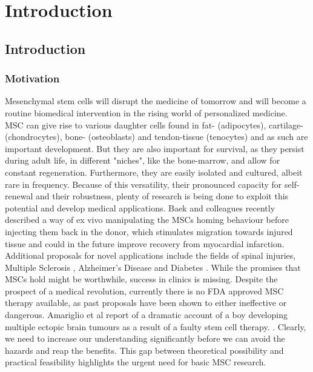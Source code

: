 
\chapter{Introduction}

\section{Introduction}
\subsection{Motivation}
\label{sec:motivation}
Mesenchymal stem cells will disrupt the medicine of tomorrow and will become a routine biomedical intervention in the rising world of personalized medicine. \\
MSC can give rise to various daughter cells found in fat- (adipocytes), cartilage- (chondrocytes), bone- (osteoblasts) and tendon-tissue (tenocytes) \cite{Barlow2008, Hass2011} and as such are important development.
But they are also important for survival, as they persist during adult life, in different "niches", like the bone-marrow, and allow for constant regeneration. Furthermore, they are easily isolated and cultured, albeit rare in frequency. Because of this versatility, their pronounced capacity for self-renewal and their robustness, plenty of research is being done to exploit this potential and develop medical applications. Baek and colleagues recently described a way of ex vivo manipulating the MSCs homing behaviour before injecting them back in the donor, which stimulates migration towards injured tissue and could in the future improve recovery from myocardial infarction. \cite{Baek2011}  Additional proposals for novel applications include the fields of spinal injuries\cite{Goldschlager2010}, Multiple Sclerosis \cite{Planchon2018}, Alzheimer's Disease \cite{Han2018, Hao2012} and Diabetes \cite{Evangelista2018}.  While the promises that MSCs hold might be worthwhile, success in clinics is missing. Despite the prospect of a medical revolution, currently there is no FDA approved MSC therapy available, as past proposals have been shown to either ineffective or dangerous. Amariglio et al report of a dramatic account of a boy developing multiple ectopic brain tumours as a result of a faulty stem cell therapy. \cite{Amariglio2009}. Clearly, we need to increase our understanding significantly before we can avoid the hazards and reap the benefits. This gap between theoretical possibility and practical feasibility highlights the urgent need for basic MSC research.\par


